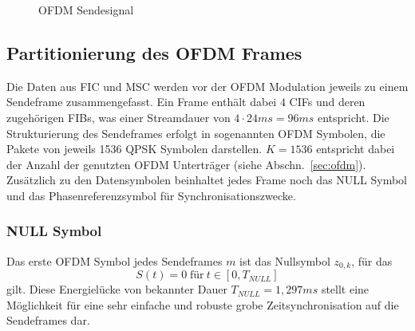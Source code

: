 \begin{figure}
\begin{center}
\end{center}
\caption{OFDM Sendesignal}
\label{chart:transmission_frame}
\end{figure}

\subsection{Partitionierung des OFDM Frames}
\label{sec:transmission_frame}
Die Daten aus FIC und MSC werden vor der OFDM Modulation jeweils zu einem Sendeframe zusammengefasst. Ein Frame enthält dabei $4$ CIFs und deren zugehörigen FIBs, was einer Streamdauer von $4\cdot24ms = 96ms$ entspricht. Die Strukturierung des Sendeframes erfolgt in sogenannten OFDM Symbolen, die Pakete von jeweils 1536 QPSK Symbolen darstellen. $K=1536$ entspricht dabei der Anzahl der genutzten OFDM Unterträger (siehe Abschn.~\ref{sec:ofdm}). 
Zusätzlich zu den Datensymbolen beinhaltet jedes Frame noch das NULL Symbol und das Phasenreferenzsymbol für Synchronisationszwecke.

\subsubsection{NULL Symbol}
Das erste OFDM Symbol jedes Sendeframes $m$ ist das Nullsymbol $z_{0,k}$, für das
\begin{equation}
S(t) = 0 \; \text{für} \: t \in [0, T_{NULL}]
\end{equation}
gilt. Diese Energielücke von bekannter Dauer $T_{NULL} = 1,297ms$ stellt eine Möglichkeit für eine sehr einfache und robuste grobe Zeitsynchronisation auf die Sendeframes dar.

